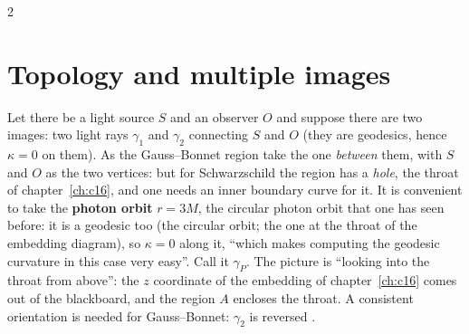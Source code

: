 \begin{paracol}{2}
\section{Topology and multiple images}\label{sec:c17-topology}

Let there be a light source $S$ and an observer $O$ and suppose there are two images: two light rays $\gamma_1$ and $\gamma_2$ connecting $S$ and $O$ (they are geodesics, hence $\kappa=0$ on them). As the Gauss--Bonnet region take the one \emph{between} them, with $S$ and $O$ as the two vertices: but for Schwarzschild the region has a \emph{hole}, the throat of chapter~\ref{ch:c16}, and one needs an inner boundary curve for it. It is convenient to take the \textbf{photon orbit} $r=3M$, the circular photon orbit that one has seen before: it is a geodesic too (the circular orbit; the one at the throat of the embedding diagram), so $\kappa=0$ along it, ``which makes computing the geodesic curvature in this case very easy''. Call it $\gamma_P$. The picture is ``looking into the throat from above'': the $z$ coordinate of the embedding of chapter~\ref{ch:c16} comes out of the blackboard, and the region $A$ encloses the throat. A consistent orientation is needed for Gauss--Bonnet: $\gamma_2$ is reversed .


\end{paracol}
